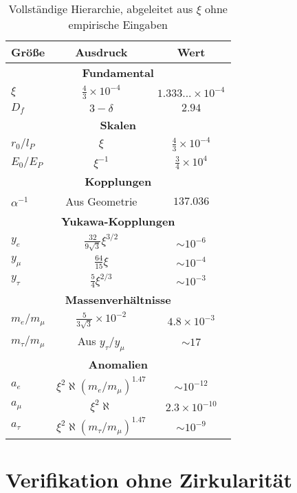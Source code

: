 \documentclass[12pt,a4paper]{article}
\newcommand{\lP}{l_P}
\newcommand{\EP}{E_P}
\newcommand{\rzero}{r_0}
\newcommand{\Ezero}{E_0}
\newcommand{\xipar}{\xi}
\begin{document}
	\begin{table}[h]
		\centering
		\begin{tabular}{lcc}
			\toprule
			\textbf{Größe} & \textbf{Ausdruck} & \textbf{Wert} \\
			\midrule
			\multicolumn{3}{c}{\textbf{Fundamental}} \\
			$\xipar$ & $\frac{4}{3} \times 10^{-4}$ & $1.333... \times 10^{-4}$ \\
			$D_f$ & $3 - \delta$ & $2.94$ \\
			\midrule
			\multicolumn{3}{c}{\textbf{Skalen}} \\
			$\rzero/\lP$ & $\xipar$ & $\frac{4}{3} \times 10^{-4}$ \\
			$\Ezero/\EP$ & $\xipar^{-1}$ & $\frac{3}{4} \times 10^{4}$ \\
			\midrule
			\multicolumn{3}{c}{\textbf{Kopplungen}} \\
			$\alpha^{-1}$ & Aus Geometrie & $137.036$ \\
			\midrule
			\multicolumn{3}{c}{\textbf{Yukawa-Kopplungen}} \\
			$y_e$ & $\frac{32}{9\sqrt{3}} \xipar^{3/2}$ & $\sim 10^{-6}$ \\
			$y_\mu$ & $\frac{64}{15} \xipar$ & $\sim 10^{-4}$ \\
			$y_\tau$ & $\frac{5}{4} \xipar^{2/3}$ & $\sim 10^{-3}$ \\
			\midrule
			\multicolumn{3}{c}{\textbf{Massenverhältnisse}} \\
			$m_e/m_\mu$ & $\frac{5}{3\sqrt{3}} \times 10^{-2}$ & $4.8 \times 10^{-3}$ \\
			$m_\tau/m_\mu$ & Aus $y_\tau/y_\mu$ & $\sim 17$ \\
			\midrule
			\multicolumn{3}{c}{\textbf{Anomalien}} \\
			$a_e$ & $\xipar^2 \aleph (m_e/m_\mu)^{1.47}$ & $\sim 10^{-12}$ \\
			$a_\mu$ & $\xipar^2 \aleph$ & $2.3 \times 10^{-10}$ \\
			$a_\tau$ & $\xipar^2 \aleph (m_\tau/m_\mu)^{1.47}$ & $\sim 10^{-9}$ \\
			\bottomrule
		\end{tabular}
		\caption{Vollständige Hierarchie, abgeleitet aus $\xipar$ ohne empirische Eingaben}
	\end{table}
	
	\section{Verifikation ohne Zirkularität}
	
\end{document}
